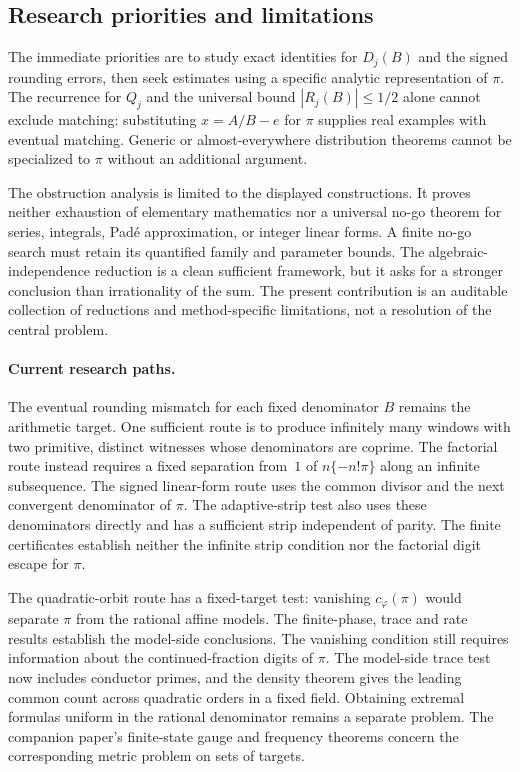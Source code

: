 \documentclass[11pt]{amsart}
\theoremstyle{definition}
\theoremstyle{remark}
\numberwithin{equation}{section}
\begin{document}
\subsection{Research priorities and limitations}

The immediate priorities are to study exact identities for $D_j(B)$ and the signed rounding errors, then seek estimates using a specific analytic representation of $\pi$. The recurrence for $Q_j$ and the universal bound $|R_j(B)|\le1/2$ alone cannot exclude matching: substituting $x=A/B-e$ for $\pi$ supplies real examples with eventual matching. Generic or almost-everywhere distribution theorems cannot be specialized to $\pi$ without an additional argument.

The obstruction analysis is limited to the displayed constructions. It proves neither exhaustion of elementary mathematics nor a universal no-go theorem for series, integrals, Pad\'e approximation, or integer linear forms. A finite no-go search must retain its quantified family and parameter bounds. The algebraic-independence reduction is a clean sufficient framework, but it asks for a stronger conclusion than irrationality of the sum. The present contribution is an auditable collection of reductions and method-specific limitations, not a resolution of the central problem.

\paragraph{Current research paths.}
The eventual rounding mismatch for each fixed denominator $B$ remains
the arithmetic target. One sufficient route is to produce infinitely many
windows with two primitive, distinct witnesses whose denominators are
coprime. The factorial route instead requires a fixed separation from~$1$
of $n\{-n!\pi\}$ along an infinite subsequence. The signed linear-form
route uses the common divisor and the next convergent denominator of
$\pi$. The adaptive-strip test also uses these denominators directly
and has a sufficient strip independent of parity. The finite
certificates establish neither the infinite strip condition nor the
factorial digit escape for $\pi$.

The quadratic-orbit route has a fixed-target test: vanishing
$c_\varphi(\pi)$ would separate $\pi$ from the rational affine models.
The finite-phase, trace and rate results establish the model-side
conclusions. The vanishing condition still requires information about the
continued-fraction digits of $\pi$. The model-side trace test now includes conductor primes,
and the density theorem gives the leading common count across
quadratic orders in a fixed field. Obtaining extremal formulas
uniform in the rational denominator remains a separate problem. The companion
paper's finite-state gauge and frequency theorems concern the corresponding
metric problem on sets of targets.
\end{document}
